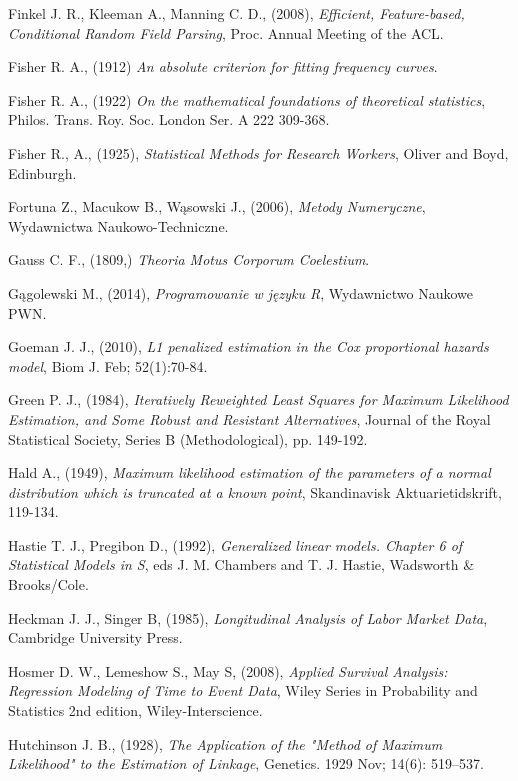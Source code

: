 \begin{thebibliography}{99}
  Finkel J. R., Kleeman A., Manning C. D., (2008), \textit{Efficient, Feature-based, Conditional Random Field Parsing}, Proc. Annual Meeting of the ACL.

 Fisher R. A., (1912) \textit{An absolute criterion for fitting frequency curves}.

 Fisher R. A., (1922) \textit{On the mathematical foundations of theoretical statistics}, Philos. Trans. Roy. Soc. London Ser. A 222 309-368.

 Fisher R., A., (1925), \textit{Statistical Methods for Research Workers}, Oliver and Boyd, Edinburgh.

 Fortuna Z., Macukow B., Wąsowski J., (2006), \textit{Metody Numeryczne}, Wydawnictwa Naukowo-Techniczne.

 Gauss C. F., (1809,) \textit{Theoria Motus Corporum Coelestium}.

 Gągolewski M., (2014), \textit{Programowanie w języku R}, Wydawnictwo Naukowe PWN.

 Goeman J. J., (2010), \textit{L1 penalized estimation in the Cox proportional hazards model}, Biom J. Feb; 52(1):70-84.

 Green P. J., (1984), \textit{Iteratively Reweighted Least Squares for Maximum Likelihood Estimation, and Some Robust and Resistant Alternatives}, Journal of the Royal Statistical Society, Series B (Methodological), pp. 149-192.


 Hald A., (1949), \textit{Maximum likelihood estimation of the parameters of a normal distribution which is truncated at a known point}, Skandinavisk Aktuarietidskrift, 119-134.


 Hastie T. J., Pregibon D., (1992), \textit{Generalized linear models. Chapter 6 of Statistical Models in S}, eds J. M. Chambers and T. J. Hastie, Wadsworth \& Brooks/Cole.


 Heckman J. J., Singer B, (1985), \textit{Longitudinal Analysis of Labor Market Data}, Cambridge University Press.

 Hosmer D. W., Lemeshow S., May S, (2008), \textit{Applied Survival Analysis: Regression Modeling of Time to Event Data}, Wiley Series in Probability and Statistics 2nd edition, Wiley-Interscience.


 Hutchinson J. B., (1928), \textit{The Application of the "Method of Maximum Likelihood" to the Estimation of Linkage}, Genetics. 1929 Nov; 14(6): 519–537.



\end{thebibliography}
